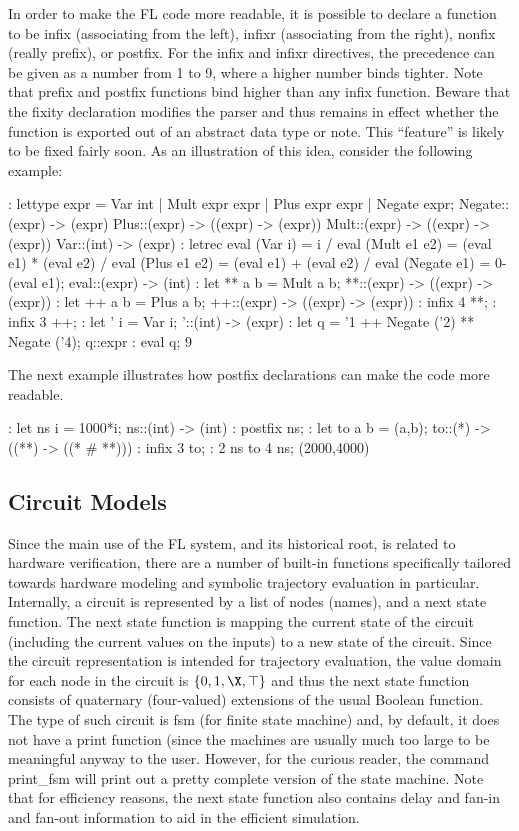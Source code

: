 In order to make the FL code more readable, it is possible to declare
a function to be infix
(associating from the left), infixr (associating from the right), nonfix
(really prefix), or postfix.
For the infix and infixr directives, the precedence can be given as
a number from 1 to 9, where a
higher number binds tighter. Note that prefix and postfix functions
bind higher than any infix
function. Beware that the fixity declaration modifies the parser and
thus remains in effect whether
the function is exported out of an abstract data type or note. This
``feature'' is likely to be fixed
fairly soon. As an illustration of this idea, consider the following example:
\begin{hol}
: lettype expr = Var int |
                Mult expr expr |
                Plus expr expr |
                Negate expr;
Negate::(expr) -> (expr)
Plus::(expr) -> ((expr) -> (expr))
Mult::(expr) -> ((expr) -> (expr))
Var::(int) -> (expr)
: letrec eval (Var i) = i /\verb@\@
         eval (Mult e1 e2) = (eval e1) * (eval e2) /\verb@\@
         eval (Plus e1 e2) = (eval e1) + (eval e2) /\verb@\@
         eval (Negate e1) = 0-(eval e1);
eval::(expr) -> (int)
: let ** a b = Mult a b;
**::(expr) -> ((expr) -> (expr))
: let ++ a b = Plus a b;
++::(expr) -> ((expr) -> (expr))
: infix 4 **;
: infix 3 ++;
: let ' i = Var i;
'::(int) -> (expr)
: let q = '1 ++ Negate ('2) ** Negate ('4);
q::expr
: eval q;
9
\end{hol}

The next example illustrates how postfix declarations can make the
code more readable.
\begin{hol}
: let ns i = 1000*i;
ns::(int) -> (int)
: postfix ns;
: let to a b = (a,b);
to::(*) -> ((**) -> ((* # **)))
: infix 3 to;
: 2 ns to 4 ns;
(2000,4000)
\end{hol}

\subsection{Circuit Models}

Since the main use of the FL system, and its historical root, is related
to hardware verification, there are a number of built-in
functions specifically tailored towards hardware modeling
and symbolic trajectory evaluation in particular. 
Internally, a circuit is represented by a list of nodes (names),
and a next state function.
The next state function is mapping the current state of the circuit
(including the current values on the inputs) to a new state
of the circuit.
Since the circuit representation is intended for trajectory evaluation,
the value domain for each node in the circuit is $\{0,1,\X,\top\}$
and thus the next state function consists of quaternary (four-valued)
extensions of the usual Boolean function.
The type of such circuit is fsm (for finite state machine) and, by
default, it does not have a print function (since the machines
are usually much too large to be meaningful anyway to the user.
However, for the curious reader, the command print\_fsm will print out
a pretty complete version of the state machine.
Note that for efficiency reasons, the next state function also
contains delay and fan-in and fan-out information to aid in the
efficient simulation.

